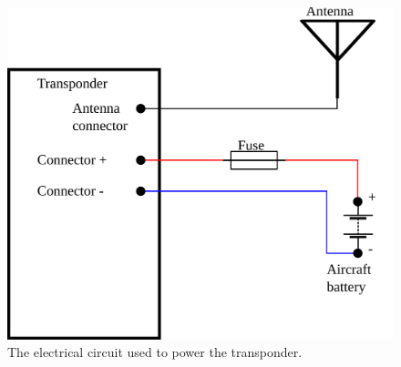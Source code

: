 \documentclass{article}
\begin{document}
\begin{figure}
\includegraphics[width=\textwidth]{circuit}
\caption{The electrical circuit used to power the transponder.}
\label{fig:circuit}
\end{figure}
\end{document}
